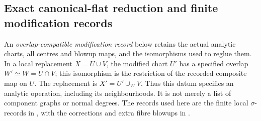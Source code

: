 \subsection{Exact canonical-flat reduction and finite modification records}

An \emph{overlap-compatible modification record} below retains the
actual analytic charts, all centres and blowup maps, and the
isomorphisms used to reglue them. In a local replacement
$X=U\cup V$, the modified chart $U'$ has a specified overlap
$W'\simeq W=U\cap V$; this isomorphism is the restriction of
the recorded composite map on $U$. The replacement is
$X'=U'\cup_W V$. Thus this datum specifies an analytic
operation, including its neighbourhoods. It is not merely a
list of component graphs or normal degrees. The records used
here are the finite local $\sigma$-records in
\cite[\S\S4.2--4.14]{Kulikov1977}, with the corrections and
extra fibre blowups in \cite[\S\S8--11]{Kulikov1981}.

